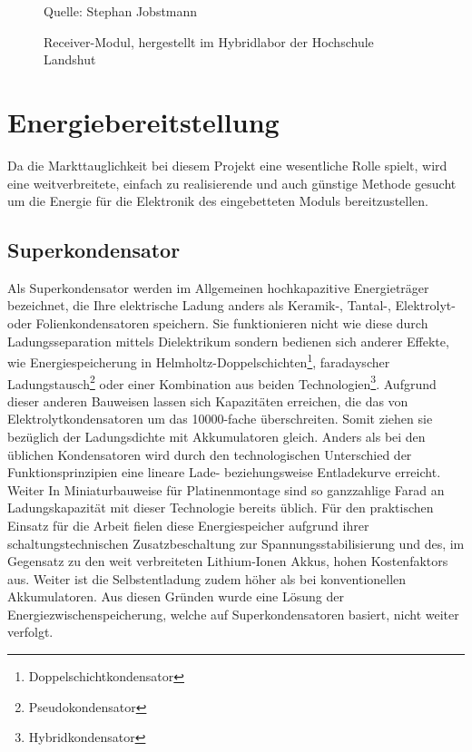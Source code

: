 \documentclass[12pt]{scrreprt} %
\begin{document}
\begin{figure}
\centering
\caption{Receiver-Modul, hergestellt im Hybridlabor der Hochschule Landshut}
Quelle: Stephan Jobstmann
\label{self_rec}
\end{figure}
\section{Energiebereitstellung}
\label{chap:4.2}
Da die Markttauglichkeit bei diesem Projekt eine wesentliche Rolle spielt, wird eine weitverbreitete, einfach zu realisierende und auch günstige Methode gesucht um die Energie für die Elektronik des eingebetteten Moduls bereitzustellen.
\subsection{Superkondensator}
Als Superkondensator werden im Allgemeinen hochkapazitive Energieträger bezeichnet, die Ihre elektrische Ladung anders als Keramik-, Tantal-, Elektrolyt- oder Folienkondensatoren speichern. Sie funktionieren nicht wie diese durch Ladungsseparation mittels Dielektrikum sondern bedienen sich anderer Effekte, wie Energiespeicherung in Helmholtz-Doppelschichten\footnote{Doppelschichtkondensator}, faradayscher Ladungstausch\footnote{Pseudokondensator} oder einer Kombination aus beiden Technologien\footnote{Hybridkondensator}. Aufgrund dieser anderen Bauweisen lassen sich Kapazitäten erreichen, die das von Elektrolytkondensatoren um das 10000-fache überschreiten. Somit ziehen sie bezüglich der Ladungsdichte mit Akkumulatoren gleich. Anders als bei den üblichen Kondensatoren wird durch den technologischen Unterschied der Funktionsprinzipien eine lineare Lade- beziehungsweise Entladekurve erreicht. Weiter In Miniaturbauweise für Platinenmontage sind so ganzzahlige Farad an Ladungskapazität mit dieser Technologie bereits üblich. Für den praktischen Einsatz für die Arbeit fielen diese Energiespeicher aufgrund ihrer schaltungstechnischen Zusatzbeschaltung zur Spannungsstabilisierung und des, im Gegensatz zu den weit verbreiteten Lithium-Ionen Akkus, hohen Kostenfaktors aus. Weiter ist die Selbstentladung zudem höher als bei konventionellen Akkumulatoren. Aus diesen Gründen wurde eine Lösung der Energiezwischenspeicherung, welche auf Superkondensatoren basiert, nicht weiter verfolgt.
\end{document}
